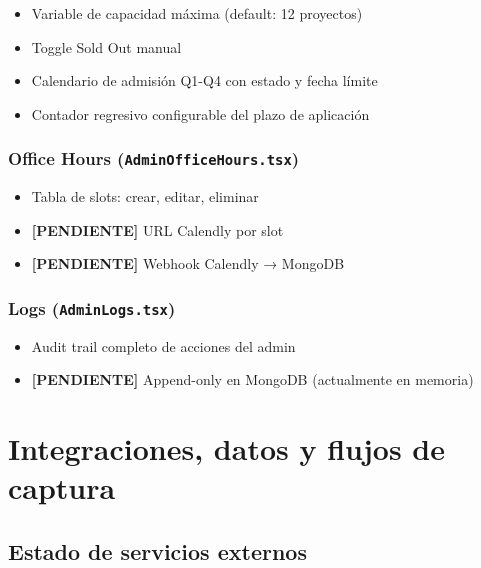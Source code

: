 \documentclass[11pt, a4paper]{article}
\newcommand{\ruta}[1]{\texttt{\color{accent2}#1}}
\newcommand{\pendientetag}{\textbf{\color{danger}[PENDIENTE]}}
\begin{document}
\begin{itemize}[leftmargin=*]
  \item Variable de capacidad máxima (default: 12 proyectos)
  \item Toggle Sold Out manual
  \item Calendario de admisión Q1-Q4 con estado y fecha límite
  \item Contador regresivo configurable del plazo de aplicación
\end{itemize}

\subsubsection{Office Hours (\ruta{AdminOfficeHours.tsx})}

\begin{itemize}[leftmargin=*]
  \item Tabla de slots: crear, editar, eliminar
  \item \pendientetag{} URL Calendly por slot
  \item \pendientetag{} Webhook Calendly → MongoDB
\end{itemize}

\subsubsection{Logs (\ruta{AdminLogs.tsx})}

\begin{itemize}[leftmargin=*]
  \item Audit trail completo de acciones del admin
  \item \pendientetag{} Append-only en MongoDB (actualmente en memoria)
\end{itemize}

\newpage


\section{Integraciones, datos y flujos de captura}

\subsection{Estado de servicios externos}
\end{document}

